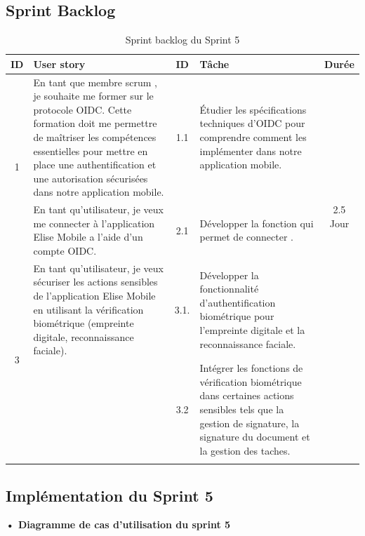 \subsection{Sprint Backlog}


\begin{adjustwidth}{-1cm}{}
    
    \begin{longtable}{|c|p{6cm}|c|p{6cm}|c|}
      \hline
      \textbf{ID} & \textbf{User story} & \textbf{ID}  & \textbf{Tâche} & \textbf{Durée} \\
      \hline
      \multirow{2}{*}{1} & En tant que membre scrum , je souhaite me former sur le protocole OIDC. Cette formation doit me permettre de maîtriser les compétences essentielles pour mettre en place une authentification et une autorisation sécurisées dans notre application mobile.
      & 1.1 & Étudier les spécifications techniques d'OIDC pour comprendre comment les implémenter dans notre application mobile. & \multirow{3}{*}{2.5 Jour} \\
      \cline{1-5}
      \multirow{2}{*}{2} & En tant qu'utilisateur, je veux me connecter à l'application Elise Mobile a l'aide d'un compte OIDC. & 2.1 & Développer la fonction qui permet de connecter . &  \multirow{3}{*}{2.5 Jour} \\
      \cline{1-5}
      \multirow{2}{*}{3} & En tant qu'utilisateur, je veux sécuriser les actions sensibles de l'application Elise Mobile en utilisant la vérification biométrique (empreinte digitale, reconnaissance faciale). & 3.1.& Développer la fonctionnalité d'authentification biométrique pour l'empreinte digitale et la reconnaissance faciale. & \multirow{2}{*}{0.5 Jour} \\
      \cline{3-4}
      & & 3.2 & Intégrer les fonctions de vérification biométrique dans certaines actions sensibles tels que la gestion de signature, la signature du document et la gestion des taches. & \\
      \cline{1-5}
  \hline
  \caption{Sprint backlog du Sprint 5}
  \label{tab:sprint-backlog-5}
\end{longtable}
\end{adjustwidth}


\subsection{Implémentation du Sprint 5}
\textbf{•	Diagramme de cas d'utilisation du sprint 5}

